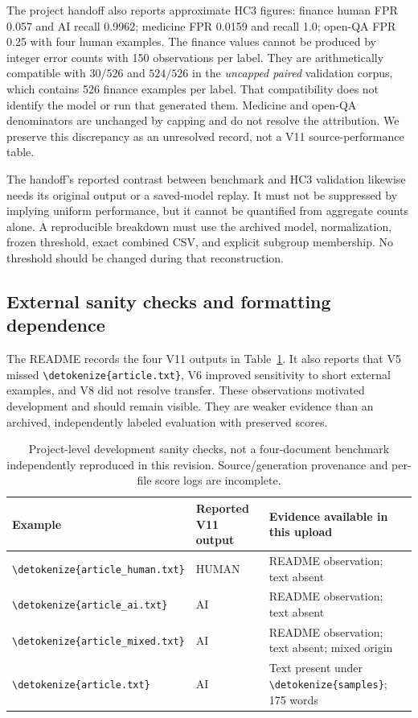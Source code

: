 \documentclass[11pt]{article}
\newcommand{\code}[1]{\expandafter\nolinkurl\expandafter{\detokenize{#1}}}
\begin{document}
The project handoff also reports approximate HC3 figures: finance human FPR
0.057 and AI recall 0.9962; medicine FPR 0.0159 and recall 1.0; open-QA FPR
0.25 with four human examples. The finance values cannot be produced by
integer error counts with 150 observations per label. They are arithmetically
compatible with $30/526$ and $524/526$ in the \emph{uncapped paired}
validation corpus, which contains 526 finance examples per label. That
compatibility does not identify the model or run that generated them.
Medicine and open-QA denominators are unchanged by capping and do not resolve
the attribution. We preserve this discrepancy as an unresolved record,
not a V11 source-performance table.

The handoff's reported contrast between benchmark and HC3 validation likewise
needs its original output or a saved-model replay. It must not be suppressed
by implying uniform performance, but it cannot be quantified from aggregate
counts alone. A reproducible breakdown must use the archived model,
normalization, frozen threshold, exact combined CSV, and explicit subgroup
membership. No threshold should be changed during that reconstruction.

\subsection{External sanity checks and formatting dependence}
The README records the four V11 outputs in Table~\ref{tab:external}. It also
reports that V5 missed \code{article.txt}, V6 improved sensitivity to short
external examples, and V8 did not resolve transfer. These observations
motivated development and should remain visible. They are weaker evidence
than an archived, independently labeled evaluation with preserved scores.

\begin{table}[htbp]
\centering\small
\begin{tabularx}{\linewidth}{llX}
\toprule
Example & Reported V11 output & Evidence available in this upload \\
\midrule
\code{article_human.txt} & HUMAN & README observation; text absent \\
\code{article_ai.txt} & AI & README observation; text absent \\
\code{article_mixed.txt} & AI & README observation; text absent; mixed origin \\
\code{article.txt} & AI & Text present under \code{samples}; 175 words \\
\bottomrule
\end{tabularx}
\caption{Project-level development sanity checks, not a four-document
benchmark independently reproduced in this revision. Source/generation
provenance and per-file score logs are incomplete.}
\label{tab:external}
\end{table}
\end{document}
